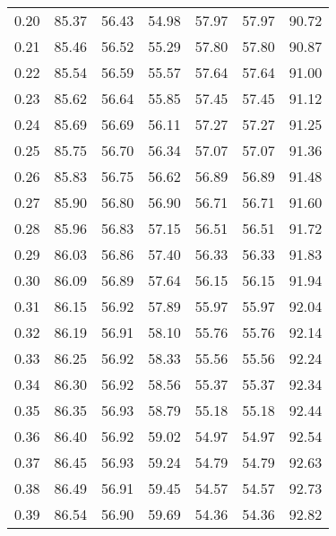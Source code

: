 \begin{tabular}{|c|c|c|c|c|c|c|}
      0.20 &     85.37 &     56.43 &      54.98 &   57.97 &      57.97 &         90.72 \\
      0.21 &     85.46 &     56.52 &      55.29 &   57.80 &      57.80 &         90.87 \\
      0.22 &     85.54 &     56.59 &      55.57 &   57.64 &      57.64 &         91.00 \\
      0.23 &     85.62 &     56.64 &      55.85 &   57.45 &      57.45 &         91.12 \\
      0.24 &     85.69 &     56.69 &      56.11 &   57.27 &      57.27 &         91.25 \\
      0.25 &     85.75 &     56.70 &      56.34 &   57.07 &      57.07 &         91.36 \\
      0.26 &     85.83 &     56.75 &      56.62 &   56.89 &      56.89 &         91.48 \\
      0.27 &     85.90 &     56.80 &      56.90 &   56.71 &      56.71 &         91.60 \\
      0.28 &     85.96 &     56.83 &      57.15 &   56.51 &      56.51 &         91.72 \\
      0.29 &     86.03 &     56.86 &      57.40 &   56.33 &      56.33 &         91.83 \\
      0.30 &     86.09 &     56.89 &      57.64 &   56.15 &      56.15 &         91.94 \\
      0.31 &     86.15 &     56.92 &      57.89 &   55.97 &      55.97 &         92.04 \\
      0.32 &     86.19 &     56.91 &      58.10 &   55.76 &      55.76 &         92.14 \\
      0.33 &     86.25 &     56.92 &      58.33 &   55.56 &      55.56 &         92.24 \\
      0.34 &     86.30 &     56.92 &      58.56 &   55.37 &      55.37 &         92.34 \\
      0.35 &     86.35 &     56.93 &      58.79 &   55.18 &      55.18 &         92.44 \\
      0.36 &     86.40 &     56.92 &      59.02 &   54.97 &      54.97 &         92.54 \\
      0.37 &     86.45 &     56.93 &      59.24 &   54.79 &      54.79 &         92.63 \\
      0.38 &     86.49 &     56.91 &      59.45 &   54.57 &      54.57 &         92.73 \\
      0.39 &     86.54 &     56.90 &      59.69 &   54.36 &      54.36 &         92.82 \\

\end{tabular}
